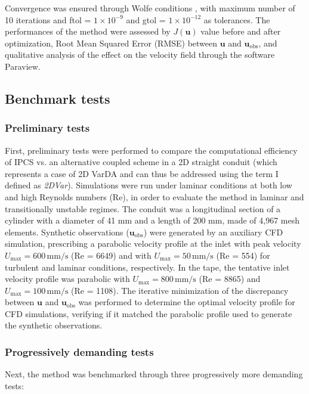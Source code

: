 Convergence was ensured through Wolfe conditions \citep{Nocedal2006}, with maximum number of 10 iterations and ftol = $1 \times 10^{-9}$ and gtol = $1 \times 10^{-12}$ as tolerances.
The performances of the method were assessed by $J(\textbf{u})$ value before and after optimization, Root Mean Squared Error (RMSE) between \( \mathbf{u}\) and \( \mathbf{u}_{\text{obs}} \), and qualitative analysis of the effect on the velocity field through the software Paraview.

\subsection*{Benchmark tests}

\label{sec:bench}
\subsubsection*{Preliminary tests}
First, preliminary tests were performed to compare the computational efficiency of IPCS vs. an alternative coupled scheme \citep{Figueroa2006} in a 2D straight conduit (which represents a case of 2D VarDA and can thus be addressed using the term I defined as \emph{2DVar}). Simulations were run under laminar conditions at both low and high Reynolds numbers (Re), in order to evaluate the method in laminar and transitionally unstable regimes.  
The conduit was a longitudinal section of a cylinder with a diameter of 41 mm and a length of 200 mm, made of 4,967 mesh elements. Synthetic observations (\( \mathbf{u}_{\text{obs}} \)) were generated by an auxiliary CFD simulation, prescribing a parabolic velocity profile at the inlet with peak velocity \( U_{\text{max}} = 600 \, \text{mm/s} \) (Re = 6649) and with \( U_{\text{max}} = 50 \, \text{mm/s} \) (Re = 554) for turbulent and laminar conditions, respectively.
In the tape, the tentative inlet velocity profile was parabolic with \( U_{\text{max}} = 800 \, \text{mm/s} \) (Re = 8865) and \( U_{\text{max}} = 100 \, \text{mm/s} \) (Re = 1108).
The iterative minimization of the discrepancy between \( \mathbf{u} \) and \( \mathbf{u}_{\text{obs}} \) was performed to determine the optimal velocity profile for CFD simulations, verifying if it matched the parabolic profile used to generate the synthetic observations.\\


\subsubsection*{Progressively demanding tests}
Next, the method was benchmarked through three progressively more demanding tests:

